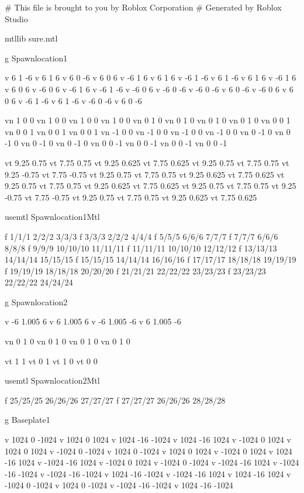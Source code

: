 # This file is brought to you by Roblox Corporation
# Generated by Roblox Studio

mtllib sure.mtl

g Spawnlocation1

v 6 1 -6 
v 6 1 6 
v 6 0 -6 
v 6 0 6 
v -6 1 6 
v 6 1 6 
v -6 1 -6 
v 6 1 -6 
v 6 1 6 
v -6 1 6 
v 6 0 6 
v -6 0 6 
v -6 1 6 
v -6 1 -6 
v -6 0 6 
v -6 0 -6 
v -6 0 -6 
v 6 0 -6 
v -6 0 6 
v 6 0 6 
v -6 1 -6 
v 6 1 -6 
v -6 0 -6 
v 6 0 -6 

vn 1 0 0 
vn 1 0 0 
vn 1 0 0 
vn 1 0 0 
vn 0 1 0 
vn 0 1 0 
vn 0 1 0 
vn 0 1 0 
vn 0 0 1 
vn 0 0 1 
vn 0 0 1 
vn 0 0 1 
vn -1 0 0 
vn -1 0 0 
vn -1 0 0 
vn -1 0 0 
vn 0 -1 0 
vn 0 -1 0 
vn 0 -1 0 
vn 0 -1 0 
vn 0 0 -1 
vn 0 0 -1 
vn 0 0 -1 
vn 0 0 -1 

vt 9.25 0.75 
vt 7.75 0.75 
vt 9.25 0.625 
vt 7.75 0.625 
vt 9.25 0.75 
vt 7.75 0.75 
vt 9.25 -0.75 
vt 7.75 -0.75 
vt 9.25 0.75 
vt 7.75 0.75 
vt 9.25 0.625 
vt 7.75 0.625 
vt 9.25 0.75 
vt 7.75 0.75 
vt 9.25 0.625 
vt 7.75 0.625 
vt 9.25 0.75 
vt 7.75 0.75 
vt 9.25 -0.75 
vt 7.75 -0.75 
vt 9.25 0.75 
vt 7.75 0.75 
vt 9.25 0.625 
vt 7.75 0.625 

usemtl Spawnlocation1Mtl

f 1/1/1 2/2/2 3/3/3 
f 3/3/3 2/2/2 4/4/4 
f 5/5/5 6/6/6 7/7/7 
f 7/7/7 6/6/6 8/8/8 
f 9/9/9 10/10/10 11/11/11 
f 11/11/11 10/10/10 12/12/12 
f 13/13/13 14/14/14 15/15/15 
f 15/15/15 14/14/14 16/16/16 
f 17/17/17 18/18/18 19/19/19 
f 19/19/19 18/18/18 20/20/20 
f 21/21/21 22/22/22 23/23/23 
f 23/23/23 22/22/22 24/24/24 

g Spawnlocation2

v -6 1.005 6 
v 6 1.005 6 
v -6 1.005 -6 
v 6 1.005 -6 

vn 0 1 0 
vn 0 1 0 
vn 0 1 0 
vn 0 1 0 

vt 1 1 
vt 0 1 
vt 1 0 
vt 0 0 

usemtl Spawnlocation2Mtl

f 25/25/25 26/26/26 27/27/27 
f 27/27/27 26/26/26 28/28/28 

g Baseplate1

v 1024 0 -1024 
v 1024 0 1024 
v 1024 -16 -1024 
v 1024 -16 1024 
v -1024 0 1024 
v 1024 0 1024 
v -1024 0 -1024 
v 1024 0 -1024 
v 1024 0 1024 
v -1024 0 1024 
v 1024 -16 1024 
v -1024 -16 1024 
v -1024 0 1024 
v -1024 0 -1024 
v -1024 -16 1024 
v -1024 -16 -1024 
v -1024 -16 -1024 
v 1024 -16 -1024 
v -1024 -16 1024 
v 1024 -16 1024 
v -1024 0 -1024 
v 1024 0 -1024 
v -1024 -16 -1024 
v 1024 -16 -1024 

